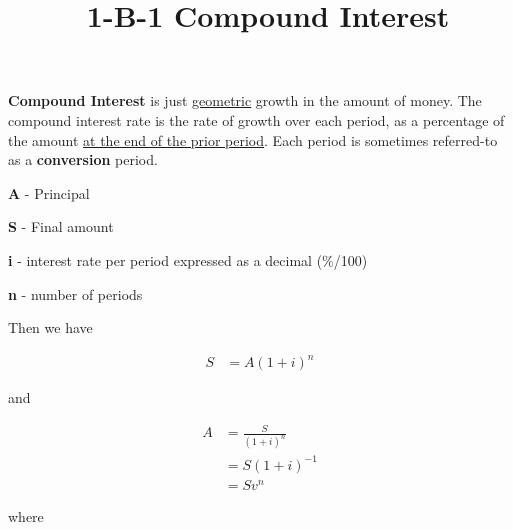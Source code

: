 \documentclass[12pt]{article}
\title{\normalfont\ 1-B-1 Compound Interest} %
\author{} %
\date{}  %
\begin{document}
\maketitle %

\vspace{-1in}

\begin{flushleft}
    \textbf{Compound Interest} is just \underline{geometric} growth in the amount of money.
    The compound interest rate is the rate of growth over each period, as a percentage of
    the amount \underline{at the end of the prior period}.  Each period is sometimes referred-to
    as a \textbf{conversion} period.
\end{flushleft}
\vspace{.1in}

\begin{description}
    \item\textbf{A} - Principal
    \item\textbf{S} - Final amount
    \item\textbf{i} - interest rate per period expressed as a decimal {(\%/100)}
    \item\textbf{n} - number of periods
\end{description}
\vspace{.1in}

\begin{flushleft}
    Then we have
\end{flushleft}
\vspace{-.1in}

\begin{align*}
    S & = A(1 + i)^n
\end{align*}
\vspace{-.1in}

\begin{flushleft}
    and
\end{flushleft}
\vspace{-.1in}

\begin{align*}
    A & = \frac{S}{(1 + i)^n} \\
      & = S(1+i)^{-1}         \\
      & = Sv^n
\end{align*}

\begin{flushleft}
    where
\end{flushleft}
\vspace{-.1in}
\end{document}
